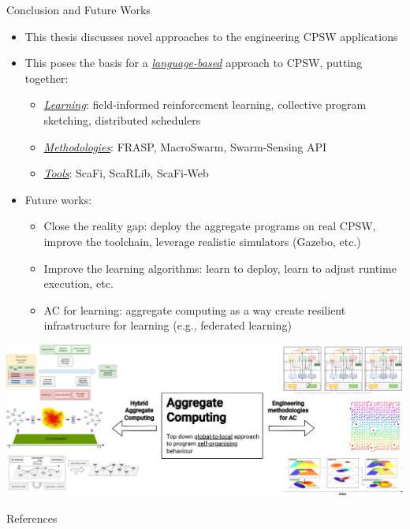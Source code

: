 \documentclass[presentation, 8pt,169]{beamer}\mode<presentation>{\usetheme{AMSBolognaFC}}
\begin{document}
\begin{frame}{Conclusion and Future Works}
\begin{itemize}
  \item This thesis discusses novel approaches to the engineering CPSW applications
  \item This poses the basis for a \emph{\underline{language-based}} approach to CPSW, putting together:
  \begin{itemize}
    \item \emph{\underline{Learning}}: field-informed reinforcement learning, collective program sketching, distributed schedulers
    \item \emph{\underline{Methodologies}}: FRASP, MacroSwarm, Swarm-Sensing API
    \item \emph{\underline{Tools}}: ScaFi, ScaRLib, ScaFi-Web
  \end{itemize}
  \item Future works:
  \begin{itemize}
    \item Close the reality gap: deploy the aggregate programs on real CPSW, improve the toolchain, leverage realistic simulators (Gazebo, etc.)
    \item Improve the learning algorithms: learn to deploy, learn to adjust runtime execution, etc.
    \item AC for learning: aggregate computing as a way create resilient infrastructure for learning (e.g., federated learning)
  \end{itemize}
\end{itemize}
\end{frame}

\begin{frame}
\includegraphics[width=\textwidth]{img/contribution.drawio.png}
\end{frame}
\begin{frame}[allowframebreaks]{References}
  \def\bibfont{\footnotesize}
  \printbibliography
\end{frame}

\end{document}
